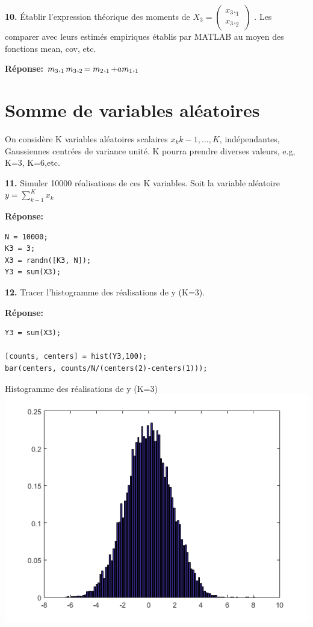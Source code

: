 \documentclass[12pt]{article}
\begin{document}
\smallbreak

\textbf{10.} Établir l'expression théorique des moments de
$X_3 =  
\begin{pmatrix}
x_3,_1 \\
x_3,_2
\end{pmatrix}
$
. Les comparer avec leurs estimés empiriques établis par MATLAB au moyen des fonctions mean, cov, etc.

\smallbreak
\textbf{Réponse:}
$
m_3,_1 \\
m_3,_2=m_2,_1 + a m_1,_1
$
\smallbreak

\section{Somme de variables aléatoires}
On considère K variables aléatoires scalaires ${x_k}k-1,...,K$, indépendantes, Gaussiennes centrées de variance unité. K pourra prendre diverses valeurs, e.g, K=3, K=6,etc.
\smallbreak

\textbf{11. }Simuler 10000 réalisations de ces K variables.
Soit la variable aléatoire $y=\sum_{k-1}^{K} x_k$

\smallbreak
\textbf{Réponse:}
\begin{lstlisting}[style=Matlab-editor]
N = 10000;
K3 = 3;
X3 = randn([K3, N]);
Y3 = sum(X3);

\end{lstlisting}


\smallbreak

\textbf{12.} Tracer l'histogramme des réalisations de y (K=3).

\smallbreak
\textbf{Réponse:}
\begin{lstlisting}[style=Matlab-editor]
Y3 = sum(X3);

[counts, centers] = hist(Y3,100);
bar(centers, counts/N/(centers(2)-centers(1)));
\end{lstlisting}
\begin{flushleft}
Histogramme des réalisations de y (K=3)
\includegraphics{3_12.PNG}
\end{flushleft}
\end{document}
